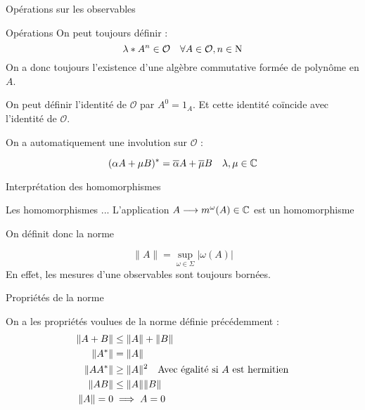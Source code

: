 \documentclass[11pt, xcolor=table]{beamer}
\begin{document}
\begin{frame}{Opérations sur les observables}
    \begin{block}{Opérations}
        On peut toujours définir :
        \[
            \lambda * A^n \in \mathcal{O} \quad \forall A \in \mathcal{O}, n \in \mathrm{N}
        \]
        On a donc toujours l'existence d'une algèbre commutative formée de polynôme en $A$.

        On peut définir l'identité de $\mathcal{O}$ par $A^0 = 1_A$. Et cette identité coïncide avec l'identité de $\mathcal{O}$.
    \end{block}

    On a automatiquement une involution sur $\mathcal{O}$ :
    \begin{mydef}
        \[
            (\alpha A + \mu B)^\ast = \overline{\alpha}A + \overline{\mu}B \quad \lambda, \mu \in \mathbb{C} 
        \]
    \end{mydef}
    
\end{frame}

\begin{frame}{Interprétation des homomorphismes}
    \begin{alertblock}{Les homomorphismes ...}
        L'application $ A \longrightarrow m^{\omega} (A) \in \mathbb{C}$ est un homomorphisme 
    \end{alertblock}
    On définit donc la norme 
    \begin{mydef}
        \[
            \| A \| = \sup_{\omega \in \Sigma} | \omega(A) | %
        \]
        En effet, les mesures d'une observables sont toujours bornées.
    \end{mydef}

\end{frame}

\begin{frame}{Propriétés de la norme}

    \begin{myth}
        On a les propriétés voulues de la norme définie précédemment :
        \begin{align*}
            \| A + B \| &\leq \| A \| + \| B \| \\
            \| A^\ast \| &= \| A \| \\
            \| A A^\ast \| &\geq \| A \|^2 \quad \text{Avec égalité si} \ A \ \text{est hermitien} \\
            \| AB \| &\leq \|A\| \| B \|\\
            \| A \| = 0 & \implies A = 0
        \end{align*}
    \end{myth}
\end{frame}
\end{document}
